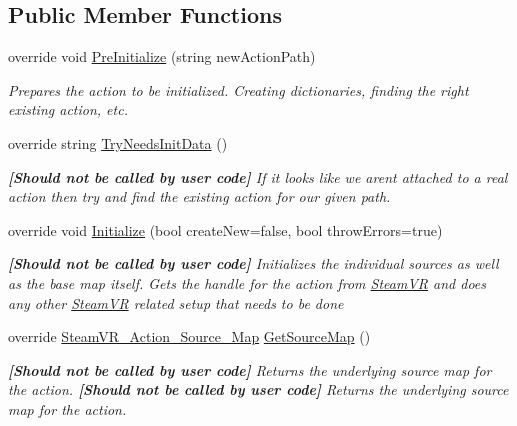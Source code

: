 \subsection*{Public Member Functions}
\begin{DoxyCompactItemize}
\item 
override void \mbox{\hyperlink{class_valve_1_1_v_r_1_1_steam_v_r___action_ae3ab26df1e48bd668134f71845cf727a}{Pre\+Initialize}} (string new\+Action\+Path)
\begin{DoxyCompactList}\small\item\em Prepares the action to be initialized. Creating dictionaries, finding the right existing action, etc. \end{DoxyCompactList}\item 
override string \mbox{\hyperlink{class_valve_1_1_v_r_1_1_steam_v_r___action_aab211e4315d3a39b4db1e033ae1e353b}{Try\+Needs\+Init\+Data}} ()
\begin{DoxyCompactList}\small\item\em {\bfseries{\mbox{[}Should not be called by user code\mbox{]}}} If it looks like we aren\textquotesingle{}t attached to a real action then try and find the existing action for our given path. \end{DoxyCompactList}\item 
override void \mbox{\hyperlink{class_valve_1_1_v_r_1_1_steam_v_r___action_a5f4858a566f91219d4896161c346f9f3}{Initialize}} (bool create\+New=false, bool throw\+Errors=true)
\begin{DoxyCompactList}\small\item\em {\bfseries{\mbox{[}Should not be called by user code\mbox{]}}} Initializes the individual sources as well as the base map itself. Gets the handle for the action from \mbox{\hyperlink{class_valve_1_1_v_r_1_1_steam_v_r}{Steam\+VR}} and does any other \mbox{\hyperlink{class_valve_1_1_v_r_1_1_steam_v_r}{Steam\+VR}} related setup that needs to be done \end{DoxyCompactList}\item 
override \mbox{\hyperlink{class_valve_1_1_v_r_1_1_steam_v_r___action___source___map}{Steam\+V\+R\+\_\+\+Action\+\_\+\+Source\+\_\+\+Map}} \mbox{\hyperlink{class_valve_1_1_v_r_1_1_steam_v_r___action_a948d9db18a20fde79dd442cd0e119fa6}{Get\+Source\+Map}} ()
\begin{DoxyCompactList}\small\item\em {\bfseries{\mbox{[}Should not be called by user code\mbox{]}}} Returns the underlying source map for the action. {\bfseries{\mbox{[}Should not be called by user code\mbox{]}}} Returns the underlying source map for the action. \end{DoxyCompactList}\item 

\end{DoxyCompactItemize}
